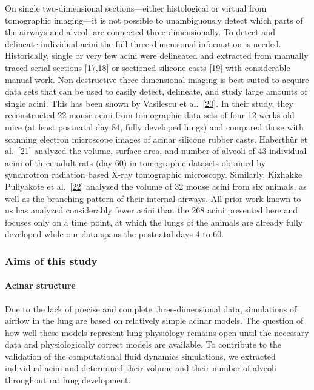 \documentclass[
  american,
]{article}
\begin{document}
On single two-dimensional sections---either histological or virtual from tomographic imaging---it is not possible to unambiguously detect which parts of the airways and alveoli are connected three-dimensionally.
To detect and delineate individual acini the full three-dimensional information is needed.
Historically, single or very few acini were delineated and extracted from manually traced serial sections {[}\protect\hyperlink{ref-c3aIB7f9}{17},\protect\hyperlink{ref-CPhMy3Ie}{18}{]} or sectioned silicone casts {[}\protect\hyperlink{ref-1GJECnKBu}{19}{]} with considerable manual work.
Non-destructive three-dimensional imaging is best suited to acquire data sets that can be used to easily detect, delineate, and study large amounts of single acini.
This has been shown by Vasilescu et al.~{[}\protect\hyperlink{ref-C6OaY84D}{20}{]}.
In their study, they reconstructed 22 mouse acini from tomographic data sets of four 12 weeks old mice (at least postnatal day 84, fully developed lungs) and compared those with scanning electron microscope images of acinar silicone rubber casts.
Haberthür et al.~{[}\protect\hyperlink{ref-7YLeeyu}{21}{]} analyzed the volume, surface area, and number of alveoli of 43 individual acini of three adult rats (day 60) in tomographic datasets obtained by synchrotron radiation based X-ray tomographic microscopy.
Similarly, Kizhakke Puliyakote et al.~{[}\protect\hyperlink{ref-RGBeCf8v}{22}{]} analyzed the volume of 32 mouse acini from six animals, as well as the branching pattern of their internal airways.
All prior work known to us has analyzed considerably fewer acini than the 268 acini presented here and focuses only on a time point, at which the lungs of the animals are already fully developed while our data spans the postnatal days 4 to 60.

\hypertarget{aims-of-this-study}{%
\subsubsection{Aims of this study}\label{aims-of-this-study}}

\hypertarget{acinar-structure}{%
\paragraph{Acinar structure}\label{acinar-structure}}

Due to the lack of precise and complete three-dimensional data, simulations of airflow in the lung are based on relatively simple acinar models.
The question of how well these models represent lung physiology remains open until the necessary data and physiologically correct models are available.
To contribute to the validation of the computational fluid dynamics simulations, we extracted individual acini and determined their volume and their number of alveoli throughout rat lung development.
\end{document}
